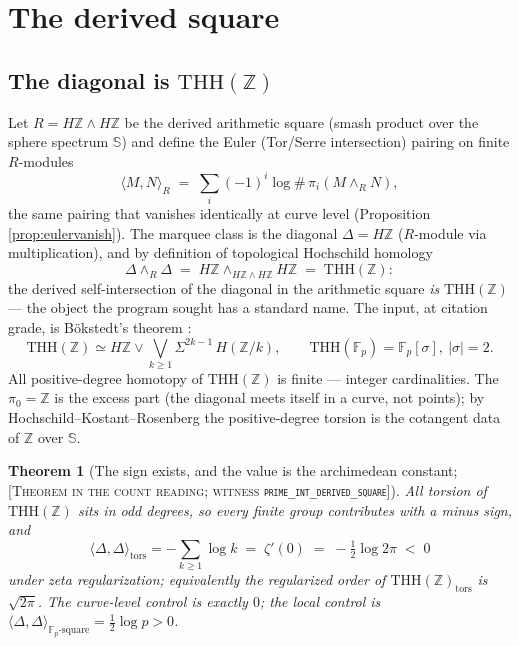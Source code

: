 \documentclass[11pt,reqno]{amsart}
\theoremstyle{plain}
\newtheorem{theorem}{Theorem}[section]
\theoremstyle{definition}
\theoremstyle{remark}
\newcommand{\Z}{\mathbb{Z}}
\newcommand{\F}{\mathbb{F}}
\newcommand{\Sph}{\mathbb{S}}
\newcommand{\THH}{\mathrm{THH}}
\newcommand{\HZ}{H\Z}
\newcommand{\grade}[1]{\textup{[\textsc{#1}]}}
\begin{document}
\section{The derived square}\label{sec:square}

\subsection{The diagonal is \texorpdfstring{$\THH(\Z)$}{THH(Z)}}

Let $R = \HZ \wedge \HZ$ be the derived arithmetic square (smash product over the sphere
spectrum $\Sph$) and define the Euler (Tor/Serre intersection) pairing on finite $R$-modules
\[
\langle M, N\rangle_R \;=\; \sum_i (-1)^i \log \#\,\pi_i\!\left(M \wedge_R N\right),
\]
the same pairing that vanishes identically at curve level (Proposition
\ref{prop:eulervanish}). The marquee class is the diagonal $\Delta = \HZ$ ($R$-module via
multiplication), and by definition of topological Hochschild homology
\[
\Delta \wedge_R \Delta \;=\; \HZ \wedge_{\HZ \wedge \HZ} \HZ \;=\; \THH(\Z):
\]
the derived self-intersection of the diagonal in the arithmetic square \emph{is} $\THH(\Z)$
--- the object the program sought has a standard name. The input, at citation grade, is
B\"okstedt's theorem \cite{Bokstedt}:
\[
\THH(\Z) \simeq \HZ \vee \bigvee_{k \ge 1} \Sigma^{2k-1}\, H(\Z/k), \qquad
\THH(\F_p) = \F_p[\sigma],\ |\sigma| = 2 .
\]
All positive-degree homotopy of $\THH(\Z)$ is finite --- integer cardinalities. The
$\pi_0 = \Z$ is the excess part (the diagonal meets itself in a curve, not points); by
Hochschild--Kostant--Rosenberg the positive-degree torsion is the cotangent data of $\Z$
over $\Sph$.

\begin{theorem}[The sign exists, and the value is the archimedean constant;
\grade{Theorem in the count reading; witness \texttt{prime\_\allowbreak int\_\allowbreak derived\_\allowbreak square}}]
\label{thm:zetaprime}
All torsion of $\THH(\Z)$ sits in odd degrees, so every finite group contributes with a minus
sign, and
\[
\langle \Delta, \Delta\rangle_{\mathrm{tors}}
= -\sum_{k \ge 1} \log k
\;=\; \zeta'(0) \;=\; -\tfrac12 \log 2\pi \;<\; 0
\]
under zeta regularization; equivalently the regularized order of $\THH(\Z)_{\mathrm{tors}}$
is $\sqrt{2\pi}$. The curve-level control is exactly $0$; the local control is
$\langle \Delta, \Delta\rangle_{\F_p\text{-square}} = \tfrac12 \log p > 0$.
\end{theorem}
\end{document}
